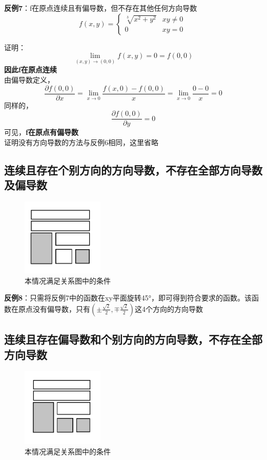 \documentclass{article}
\begin{document}
\textbf{反例7}：f在原点连续且有偏导数，但不存在其他任何方向导数
\[f(x,y)= \begin{cases}  \sqrt[3]{x^2+y^2}  & xy \neq 0 \\ 0 & xy = 0\end{cases}\ \]

证明：
\[\lim\limits_{(x,y) \rightarrow (0,0)} f(x,y) = 0 = f(0,0)\]
\textbf{因此f在原点连续}\\
由偏导数定义，
\[\frac{\partial f(0,0)}{\partial x}=  \lim\limits_{x \rightarrow 0} \frac{f(x,0)-f(0,0)}{x} = \lim\limits_{x \rightarrow 0} \frac{0-0}{x} = 0\]
同样的，
\[\frac{\partial f(0,0)}{\partial y} = 0\]
可见，\textbf{f在原点有偏导数}\\
证明没有方向导数的方法与反例6相同，这里省略

\newpage

\subsection{连续且存在个别方向的方向导数，不存在全部方向导数及偏导数}
\begin{figure}[!h]
    \centering
    \includegraphics[width=0.35\textwidth]{pic/09.png}
    \caption{本情况满足关系图中的条件}
\end{figure}

\textbf{反例8}：只需将反例7中的函数在xy平面旋转45°，即可得到符合要求的函数。该函数在原点没有偏导数，只有$\left( \pm \frac{\sqrt{2}}{2} , \mp \frac{\sqrt{2}}{2} \right)$这4个方向的方向导数


\subsection{连续且存在偏导数和个别方向的方向导数，不存在全部方向导数}
\begin{figure}[!h]
    \centering
    \includegraphics[width=0.35\textwidth]{pic/10.png}
    \caption{本情况满足关系图中的条件}
\end{figure}
\end{document}
